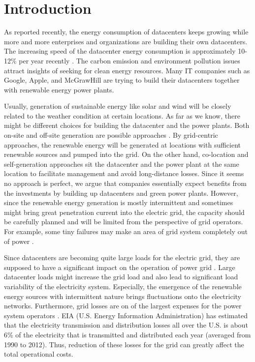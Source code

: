 \section{Introduction}
\label{sec:intro}

As reported recently, the energy consumption of datacenters keeps growing while more and more enterprises and organizations are building their own datacenters\cite{urgaonkar2011optimal,Koomey2011}. The increasing speed of the datacenter energy consumption is approximately 10-12\% per year recently \cite{ghatikar2014demand}. The carbon emission and environment pollution issues attract insights of seeking for clean energy resources. Many IT companies such as Google\cite{GoogleGreen}, Apple\cite{Apple13}, and McGrawHill\cite{McGrawHill11} are trying to build their datacenters together with renewable energy power plants.

Usually, generation of sustainable energy like solar and wind will be closely related to the weather condition at certain locations. As far as we know, there might be different choices for building the datacenter and the power plants. Both on-site and off-site generation are possible approaches \cite {Goiri13}. By grid-centric approaches, the renewable energy will be generated at locations with sufficient renewable sources and pumped into the grid. On the other hand, co-location and self-generation approaches sit the datacenter and the power plant at the same location to facilitate management and avoid long-distance losses. Since it seems no approach is perfect, we argue that companies essentially expect benefits from the investments by building up datacenters and green power plants. However, since the renewable energy generation is mostly intermittent and sometimes might bring great penetration current into the electric grid, the capacity should be carefully planned and will be limited from the perspective of grid operators. For example, some tiny failures may make an area of grid system completely out of power \cite{nytimes2014}.

Since datacenters are becoming quite large loads for the electric grid, they are supposed to have a significant impact on the operation of power grid \cite{haowang2014grid}. Large datacenter loads might increase the grid load and also lead to significant load variability of the electricity system. Especially, the emergence of the renewable energy sources with intermittent nature brings fluctuations onto the electricity networks. Furthermore, grid losses are on of the largest expenses for the power system operators \cite{de2014investigation}. EIA (U.S. Energy Information Administration) \cite{EIA} has estimated that the electricity transmission and distribution losses all over the U.S. is about 6\% of the electricity that is transmitted and distributed each year (averaged from 1990 to 2012). Thus, reduction of these losses for the grid can greatly affect the total operational costs.


